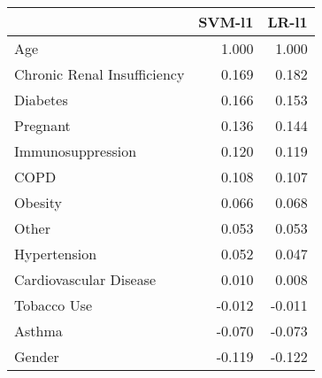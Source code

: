 \begin{tabular}{lrr}
\toprule
{} &  SVM-l1 &  LR-l1 \\
\midrule
Age                         &   1.000 &  1.000 \\
Chronic Renal Insufficiency &   0.169 &  0.182 \\
Diabetes                    &   0.166 &  0.153 \\
Pregnant                    &   0.136 &  0.144 \\
Immunosuppression           &   0.120 &  0.119 \\
COPD                        &   0.108 &  0.107 \\
Obesity                     &   0.066 &  0.068 \\
Other                       &   0.053 &  0.053 \\
Hypertension                &   0.052 &  0.047 \\
Cardiovascular Disease      &   0.010 &  0.008 \\
Tobacco Use                 &  -0.012 & -0.011 \\
Asthma                      &  -0.070 & -0.073 \\
Gender                      &  -0.119 & -0.122 \\
\bottomrule
\end{tabular}

